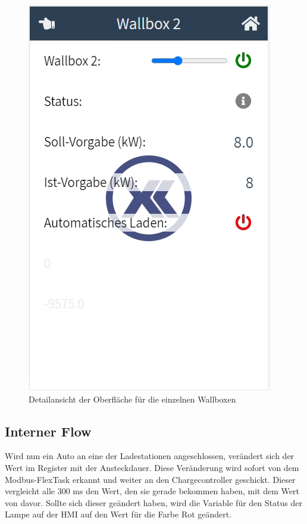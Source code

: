 \begin{figure}[h t]
\centering
\includegraphics[scale=0.6]{pics/DetailansichtWallbox2.png}
\caption{Detailansicht der Oberfläche für die einzelnen Wallboxen }
\label{fig:impl:HMIWallboxDetail}
\end{figure}



\subsection{Interner Flow}


Wird nun ein Auto an eine der Ladestationen angeschlossen, verändert sich der Wert im Register mit der Ansteckdauer. Diese Veränderung wird sofort von dem Modbus-FlexTask erkannt und weiter an den Chargecontroller geschickt. Dieser vergleicht alle 300 ms den Wert, den sie gerade bekommen haben, mit dem Wert von davor. Sollte sich dieser geändert haben, wird die Variable für den Status der Lampe auf der HMI auf den Wert für die Farbe Rot geändert.


